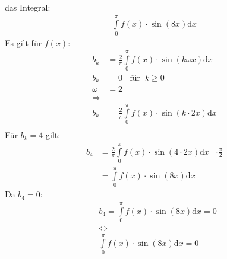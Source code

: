 das Integral:\\
\begin{align*}
\int\limits_{0}^{\pi} f(x)\cdot\sin(8x)\mathrm{d}x
\end{align*}
Es gilt für $ f(x) $:\\
\begin{align*}
b_k&=\frac{2}{\pi}\int\limits_{0}^{\pi} f(x)\cdot\sin(k\omega x)\mathrm{d}x\\
b_k&=0\;\;\text{ für}\;\;k\geq 0\\
\omega&=2\\
\Rightarrow&\\
b_k&=\frac{2}{\pi}\int\limits_{0}^{\pi} f(x)\cdot\sin(k\cdot2x)\mathrm{d}x\\
\end{align*}
Für $ b_k=4 $ gilt:\\
\begin{align*}
b_4&=\frac{2}{\pi}\int\limits_{0}^{\pi} f(x)\cdot\sin(4\cdot2x)\mathrm{d}x\;\;|\cdot\frac{\pi}{2}\\
&=\int\limits_{0}^{\pi} f(x)\cdot\sin(8x)\mathrm{d}x\
\end{align*}
Da $ b_4=0 $:\\
\begin{align*}
&b_4=\int\limits_{0}^{\pi} f(x)\cdot\sin(8x)\mathrm{d}x=0\\
&\Leftrightarrow\\
&\int\limits_{0}^{\pi} f(x)\cdot\sin(8x)\mathrm{d}x=0\\
\end{align*}
